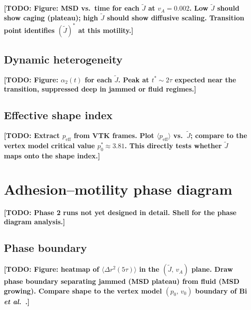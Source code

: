 \documentclass[aps,pre,twocolumn,superscriptaddress,longbibliography]{revtex4-2}
\newcommand{\vA}{v_{\!A}}                  %
\newcommand{\peff}{p_{\mathrm{eff}}}       %
\newcommand{\Jk}{\tilde{J}}                %
\newcommand{\todo}[1]{{\color{red}\textbf{[TODO: #1]}}}
\begin{document}
\todo{Figure: MSD vs.\ time for each $\Jk$ at $\vA = 0.002$.  Low $\Jk$
should show caging (plateau); high $\Jk$ should show diffusive scaling.
Transition point identifies $(\Jk)^*$ at this motility.}

\subsection{Dynamic heterogeneity}
\label{sec:motility:alpha2}

\todo{Figure: $\alpha_2(t)$ for each $\Jk$.  Peak at $t^* \sim 2\tau$
expected near the transition, suppressed deep in jammed or fluid regimes.}

\subsection{Effective shape index}
\label{sec:motility:shape}

\todo{Extract $\peff$ from VTK frames.  Plot $\langle\peff\rangle$ vs.\
$\Jk$; compare to the vertex model critical value $p_0^* \approx 3.81$.
This directly tests whether $\Jk$ maps onto the shape index.}


\section{Adhesion--motility phase diagram}
\label{sec:diagram}


\todo{Phase 2 runs not yet designed in detail.  Shell for the phase diagram
analysis.}

\subsection{Phase boundary}
\label{sec:diagram:boundary}

\todo{Figure: heatmap of $\langle\Delta r^2(5\tau)\rangle$ in the
$(\Jk,\,\vA)$ plane.  Draw phase boundary separating jammed (MSD plateau)
from fluid (MSD growing).  Compare shape to the vertex model
$(p_0,\,v_0)$ boundary of Bi \textit{et al.}~\cite{Bi2016}.}
\end{document}
